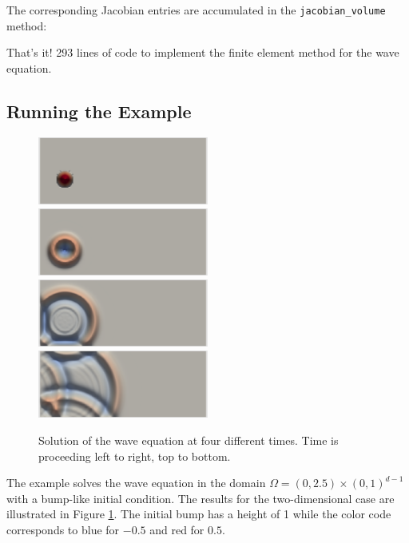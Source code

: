 \documentclass[a4paper,12pt]{article}
\begin{document}
The corresponding Jacobian entries are accumulated in the
\lstinline{jacobian_volume} method:


That's it! 293 lines of code to implement the finite element method for
the wave equation.

\subsection{Running the Example}

\begin{figure}
\begin{center}
\includegraphics[width=0.499\textwidth]{wave_0}\hfill
\includegraphics[width=0.499\textwidth]{wave_1}
\includegraphics[width=0.499\textwidth]{wave_2}\hfill
\includegraphics[width=0.499\textwidth]{wave_3}
\end{center}
\caption{Solution of the wave equation at four different times. Time is proceeding left
to right, top to bottom.}
\label{fig:Bunt}
\end{figure}

The example solves the wave equation in the domain
$\Omega = (0,2.5)\times (0,1)^{d-1}$ with a bump-like
initial condition. The results for the two-dimensional case are
illustrated in Figure \ref{fig:Bunt}. The initial bump has a height of 1
while the color code corresponds to blue for $-0.5$ and red for $0.5$.
\end{document}
